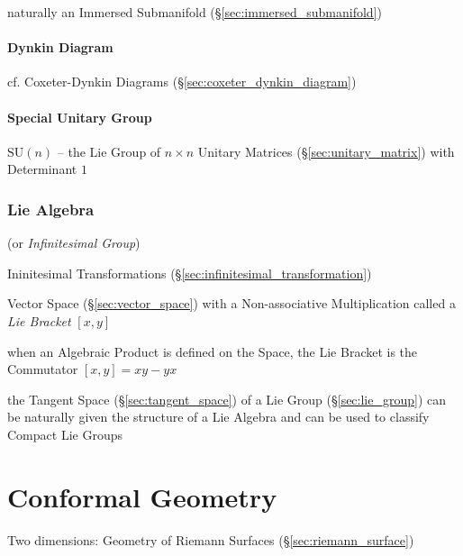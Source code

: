 naturally an Immersed Submanifold (\S\ref{sec:immersed_submanifold})



\paragraph{Dynkin Diagram}\label{sec:dynkin_diagram}\hfill

cf. Coxeter-Dynkin Diagrams (\S\ref{sec:coxeter_dynkin_diagram})



\paragraph{Special Unitary Group}\label{sec:special_unitary}\hfill

$\mathrm{SU}(n)$ -- the Lie Group of $n \times n$ Unitary Matrices
(\S\ref{sec:unitary_matrix}) with Determinant $1$



\subsubsection{Lie Algebra}\label{sec:lie_algebra}

(or \emph{Infinitesimal Group})

Ininitesimal Transformations
(\S\ref{sec:infinitesimal_transformation})

Vector Space (\S\ref{sec:vector_space}) with a Non-associative
Multiplication called a \emph{Lie Bracket} $[x,y]$

when an Algebraic Product is defined on the Space, the Lie Bracket is
the Commutator $[x,y] = xy - yx$ %

the Tangent Space (\S\ref{sec:tangent_space}) of a Lie Group
(\S\ref{sec:lie_group}) can be naturally given the structure of a Lie Algebra
and can be used to classify Compact Lie Groups



\section{Conformal Geometry}\label{sec:conformal_geometry}

Two dimensions: Geometry of Riemann Surfaces
(\S\ref{sec:riemann_surface})



